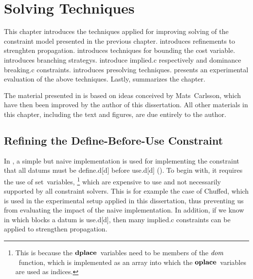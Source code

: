 %

\chapter{Solving Techniques}

This chapter introduces the techniques applied for improving solving of the
\gls{constraint model} presented in the previous chapter.
%
%
 introduces 
refinements to strenghten \gls{propagation}.
%
 introduces techniques for bounding the \gls{cost
  variable}.
%
 introduces \glspl{branching strategy}.
%
 introduce
\gls{implied.c} respectively  and \gls{dominance
  breaking.c} \glspl{constraint}.
%
 introduces \gls{presolving} techniques.
%
 presents an experimental evaluation of
the above techniques.
%
Lastly,  summarizes the chapter.

The material presented in  is
based on ideas conceived by Mats~Carlsson, which have then been improved by the
author of this dissertation.
%
All other materials in this chapter, including the text and figures, are due
entirely to the author.


\section{Refining the Define-Before-Use Constraint}

In , a simple but naive implementation is used for
implementing the \gls{constraint} that all \glspl{datum} must be
\gls{define.d}[d] before \gls{use.d}[d] ().
%
To begin with, it requires the use of set~\glspl{variable},\!%
%
\footnote{%
  This is because the $\mVar{dplace}$~\glspl{variable} need to be members of the
  $\operatorname{\textrm{\textit{dom}}}$~\gls{function}, which is implemented as an array into which the
  $\mVar{oplace}$~\glspl{variable} are used as indices.%
}
%
which are expensive to use and not necessarily supported by all
\glspl{constraint solver}.
%
This is for example the case of \gls{Chuffed}, which is used in the experimental
setup applied in this dissertation, thus preventing us from evaluating the
impact of the naive implementation.
%
In addition, if we know in which \glspl{block} a \gls{datum} is \gls{use.d}[d],
then many \gls{implied.c} \glspl{constraint} can be applied to strengthen
\gls{propagation}.

